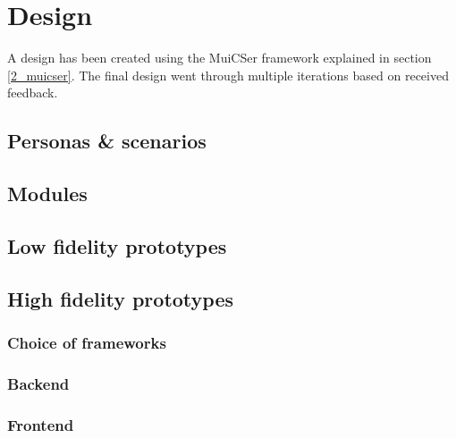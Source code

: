 \section{Design}
    
A design has been created using the MuiCSer framework explained in section \ref{2_muicser}. The final design went through multiple iterations based on received feedback.

    \subsection{Personas \& scenarios}

    \subsection{Modules}

    \subsection{Low fidelity prototypes}

    \subsection{High fidelity prototypes}

        \subsubsection{Choice of frameworks}

        \subsubsection{Backend}

        \subsubsection{Frontend}
